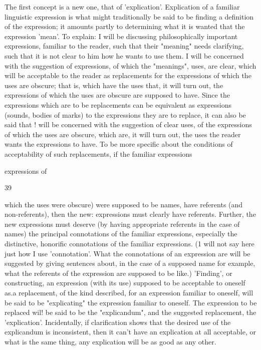 \documentclass[10pt,twoside]{memoir}
\begin{document}
\begin{enumerate}
{{{{{The first concept is a new one, that of 'explication'. Explication of a 
familiar linguistic expression is what might traditionally be said to be finding 
a definition of the expression; it amounts partly to determining what it is 
wanted that the expression 'mean'. To explain: I will be discussing 
philosophically important expressions, familiar to the reader, such that their 
"meaning" needs clarifying, such that it is not clear to him how he wants to 
use them. I will be concerned with the suggestion of expressions, of which 
the "meanings", uses, are clear, which will be acceptable to the reader as 
replacements for the expressions of which the uses are obscure; that is, 
which have the uses that, it will turn out, the expressions of which the uses 
are obscure are supposed to have. Since the expressions which are to be 
replacements can be equivalent as expressions (sounds, bodies of marks) to 
the expressions they are to replace, it can also be said that ! will be 
concerned with the suggestion of clear uses, of the expressions of which the 
uses are obscure, which are, it will turn out, the uses the reader wants the 
expressions to have. To be more specific about the conditions of 
acceptability of such replacements, if the familiar expressions {expressions of 


39 


which the uses were obscure) were supposed to be names, have referents 
(and non-referents), then the new: expressions must clearly have referents. 
Further, the new expressions must deserve (by having appropriate referents 
in the case of names) the principal connotations of the familiar expressions, 
especially the distinctive, honorific connotations of the familiar expressions. 
(1 will not say here just how I use 'connotation'. What the connotations of 
an expression are will be suggested by giving sentences about, in the case of a 
supposed name for example, what the referents of the expression are 
supposed to be like.) 'Finding', or constructing, an expression (with its use) 
supposed to be acceptable to oneself as.a replacement, of the kind described, 
for an expression familiar to oneself, will be said to be "explicating" the 
expression familiar to oneself. The expression to be replaced wil! be said to 
be the "explicandum", and the suggested replacement, the 'explication'. 
Incidentally, if clarification shows that the desired use of the explicandum is 
inconsistent, then it can't have an explication at all acceptable, or what is the 
same thing, any explication will be as good as any other. 

}}}}}}
\end{enumerate}
\end{document}
